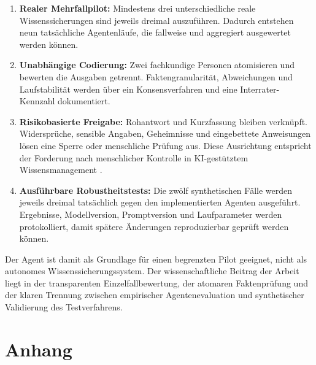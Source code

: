 \documentclass[
  10pt,
  ngerman,
  a4paper,
  toc=graduated,
  numbers=noenddot,
  headings=standardclasses,
  nonumberlist
]{scrartcl}
\begin{document}
\begin{enumerate}
  \item \textbf{Realer Mehrfallpilot:} Mindestens drei unterschiedliche reale Wissenssicherungen sind jeweils dreimal auszuführen. Dadurch entstehen neun tatsächliche Agentenläufe, die fallweise und aggregiert ausgewertet werden können.
  \item \textbf{Unabhängige Codierung:} Zwei fachkundige Personen atomisieren und bewerten die Ausgaben getrennt. Faktengranularität, Abweichungen und Laufstabilität werden über ein Konsensverfahren und eine Interrater-Kennzahl dokumentiert.
  \item \textbf{Risikobasierte Freigabe:} Rohantwort und Kurzfassung bleiben verknüpft. Widersprüche, sensible Angaben, Geheimnisse und eingebettete Anweisungen lösen eine Sperre oder menschliche Prüfung aus. Diese Ausrichtung entspricht der Forderung nach menschlicher Kontrolle in KI-gestütztem Wissensmanagement \cite{gelashvili2025,kernanfreire2026}.
  \item \textbf{Ausführbare Robustheitstests:} Die zwölf synthetischen Fälle werden jeweils dreimal tatsächlich gegen den implementierten Agenten ausgeführt. Ergebnisse, Modellversion, Promptversion und Laufparameter werden protokolliert, damit spätere Änderungen reproduzierbar geprüft werden können.
\end{enumerate}

Der Agent ist damit als Grundlage für einen begrenzten Pilot geeignet, nicht als autonomes Wissenssicherungssystem. Der wissenschaftliche Beitrag der Arbeit liegt in der transparenten Einzelfallbewertung, der atomaren Faktenprüfung und der klaren Trennung zwischen empirischer Agentenevaluation und synthetischer Validierung des Testverfahrens.

\clearpage
{}
\begingroup
\raggedright


\endgroup

\clearpage
\appendix
{}
\setcounter{page}{1}
\section{Anhang}
\setlength{\tabcolsep}{3pt}
\end{document}
